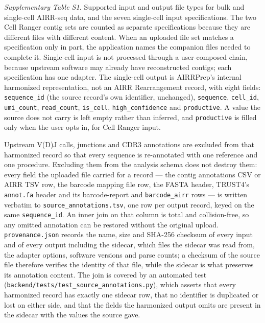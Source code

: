 \documentclass[11pt]{article}
\begin{document}
{\small\textit{Supplementary Table S1.} Supported input and output file types
for bulk and single-cell AIRR-seq data, and the seven single-cell input
specifications. The two Cell Ranger contig sets are counted as separate
specifications because they are different files with different content. When
an uploaded file set matches a specification only in part, the application
names the companion files needed to complete it. Single-cell input is not
processed through a user-composed chain, because upstream software may already
have reconstructed contigs; each specification has one adapter. The
single-cell output is AIRRPrep's internal harmonized representation, not an
AIRR Rearrangement record, with eight fields: \texttt{sequence\_id} (the source
record's own identifier, unchanged), \texttt{sequence}, \texttt{cell\_id},
\texttt{umi\_count}, \texttt{read\_count}, \texttt{is\_cell},
\texttt{high\_confidence} and \texttt{productive}. A value the source does not
carry is left empty rather than inferred, and \texttt{productive} is filled only
when the user opts in, for Cell Ranger input.

Upstream V(D)J calls, junctions and CDR3 annotations are excluded from that
harmonized record so that every sequence is re-annotated with one reference
and one procedure. Excluding them from the analysis schema does not destroy
them: every field the uploaded file carried for a record --- the contig
annotations CSV or AIRR TSV row, the barcode mapping file row, the FASTA
header, TRUST4's \texttt{annot.fa} header and its barcode-report and
\texttt{barcode\_airr} rows --- is written verbatim to
\texttt{source\_annotations.tsv}, one row per output record, keyed on the same
\texttt{sequence\_id}. An inner join on that column is total and
collision-free, so any omitted annotation can be restored without the original
upload. \texttt{provenance.json} records the name, size and SHA-256 checksum of
every input and of every output including the sidecar, which files the sidecar
was read from, the adapter options, software versions and parse counts; a
checksum of the source file therefore verifies the identity of that file,
while the sidecar is what preserves its annotation content. The join is
covered by an automated test
(\texttt{backend/tests/test\_source\_annotations.py}), which asserts
that every harmonized record has exactly one sidecar row, that no identifier
is duplicated or lost on either side, and that the fields the harmonized
output omits are present in the sidecar with the values the source gave.\par}
\end{document}

